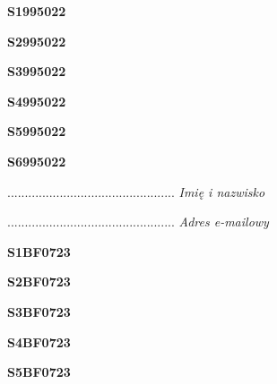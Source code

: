 \begin{turn}{90}\huge \textbf{S1995022}\end{turn}

\begin{turn}{90}\huge \textbf{S2995022}\end{turn}

\begin{turn}{90}\huge \textbf{S3995022}\end{turn}

\begin{turn}{90}\huge \textbf{S4995022}\end{turn}

\begin{turn}{90}\huge \textbf{S5995022}\end{turn}

\begin{turn}{90}\huge \textbf{S6995022}\end{turn}

\begin{turn}{90}\begin{minipage}{\linewidth} \vspace{20mm} ................................................  \textit{Imię i nazwisko}\end{minipage}\end{turn}

\begin{turn}{90}\begin{minipage}{\linewidth} \vspace{20mm} ................................................  \textit{Adres e-mailowy}\end{minipage}\end{turn}

\begin{turn}{90}\huge \textbf{S1BF0723}\end{turn}

\begin{turn}{90}\huge \textbf{S2BF0723}\end{turn}

\begin{turn}{90}\huge \textbf{S3BF0723}\end{turn}

\begin{turn}{90}\huge \textbf{S4BF0723}\end{turn}

\begin{turn}{90}\huge \textbf{S5BF0723}\end{turn}

